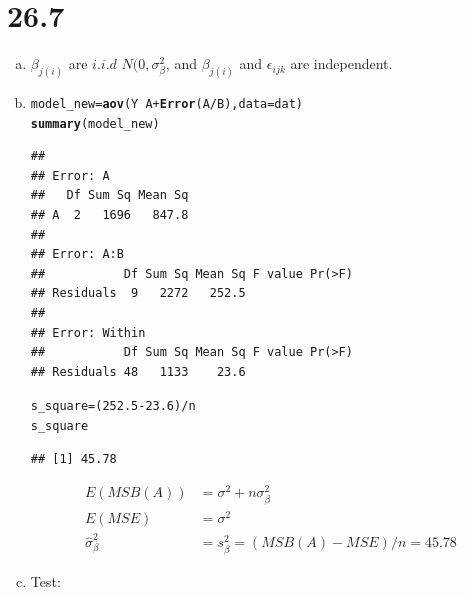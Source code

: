 \documentclass{article}\usepackage[]{graphicx}\usepackage[]{color}
\makeatletter
\newcommand{\hlnum}[1]{\textcolor[rgb]{0.686,0.059,0.569}{#1}}%
\newcommand{\hlopt}[1]{\textcolor[rgb]{0,0,0}{#1}}%
\newcommand{\hlstd}[1]{\textcolor[rgb]{0.345,0.345,0.345}{#1}}%
\newcommand{\hlkwb}[1]{\textcolor[rgb]{0.69,0.353,0.396}{#1}}%
\newcommand{\hlkwc}[1]{\textcolor[rgb]{0.333,0.667,0.333}{#1}}%
\newcommand{\hlkwd}[1]{\textcolor[rgb]{0.737,0.353,0.396}{\textbf{#1}}}%
\newenvironment{kframe}{%
 \def\at@end@of@kframe{}%
 \ifinner\ifhmode%
  \def\at@end@of@kframe{\end{minipage}}%
  \begin{minipage}{\columnwidth}%
 \fi\fi%
 \def\FrameCommand##1{\hskip\@totalleftmargin \hskip-\fboxsep
 \colorbox{shadecolor}{##1}\hskip-\fboxsep
     \hskip-\linewidth \hskip-\@totalleftmargin \hskip\columnwidth}%
 \MakeFramed {\advance\hsize-\width
   \@totalleftmargin\z@ \linewidth\hsize
   \@setminipage}}%
 {\par\unskip\endMakeFramed%
 \at@end@of@kframe}
\newenvironment{knitrout}{}{} %
\makeatother
\begin{document}
\section{26.7}

\begin{enumerate}[(a)]

\item

\qquad $\beta_{j(i)}$ are $i.i.d$ $N(0, \sigma^2_\beta$, and $\beta_{j(i)}$ and $\epsilon_{ijk}$ are independent.

\item

\begin{knitrout}
\color{fgcolor}\begin{kframe}
\begin{alltt}
  \hlstd{model_new} \hlkwb{=} \hlkwd{aov}\hlstd{(Y} \hlopt{~} \hlstd{A}\hlopt{+} \hlkwd{Error}\hlstd{(A}\hlopt{/}\hlstd{B),} \hlkwc{data} \hlstd{= dat)}
  \hlkwd{summary}\hlstd{(model_new)}
\end{alltt}
\begin{verbatim}
## 
## Error: A
##   Df Sum Sq Mean Sq
## A  2   1696   847.8
## 
## Error: A:B
##           Df Sum Sq Mean Sq F value Pr(>F)
## Residuals  9   2272   252.5               
## 
## Error: Within
##           Df Sum Sq Mean Sq F value Pr(>F)
## Residuals 48   1133    23.6
\end{verbatim}
\begin{alltt}
  \hlstd{s_square} \hlkwb{=} \hlstd{(}\hlnum{252.5}\hlopt{-}\hlnum{23.6}\hlstd{)}\hlopt{/}\hlstd{n}
  \hlstd{s_square}
\end{alltt}
\begin{verbatim}
## [1] 45.78
\end{verbatim}
\end{kframe}
\end{knitrout}

\begin{displaymath}
\begin{split}
E(MSB(A)) &= \sigma^2 + n\sigma^2_{\beta}\\
E(MSE) &= \sigma^2 \\
\hat{\sigma}_\beta^2 &= s^2_\beta = (MSB(A)-MSE)/n = 45.78
\end{split}
\end{displaymath}

\item

Test:


\end{enumerate}
\end{document}
